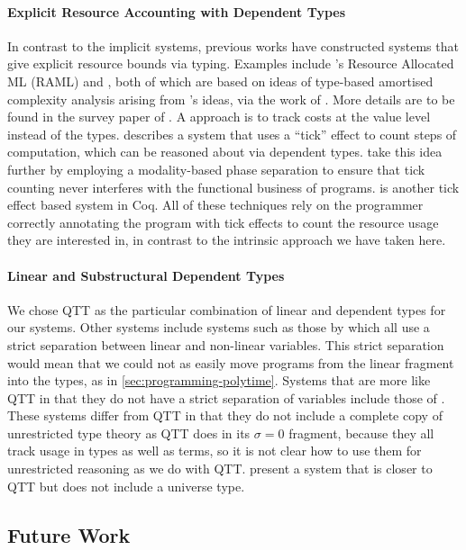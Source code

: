 \documentclass[acmsmall,screen]{acmart}
\begin{document}
\paragraph{Explicit Resource Accounting with Dependent Types} In
contrast to the implicit systems, previous works have constructed
systems that give explicit resource bounds via typing. Examples
include \citet{HoffmannDW17}'s Resource Allocated ML (RAML) and
\citet{RajaniG0021}, both of which are based on ideas of type-based
amortised complexity analysis arising from \cite{hofmann99lfpl}'s
ideas, via the work of \cite{HofmannJ03}. More details are to be found
in the survey paper of \citet{HoffmannJ22}. A approach is to track
costs at the value level instead of the types. \citet{Danielsson08}
describes a system that uses a ``tick'' effect to count steps of
computation, which can be reasoned about via dependent
types. \citet{NiuSGH22} take this idea further by employing a
modality-based phase separation to ensure that tick counting never
interferes with the functional business of
programs. \citet{McCarthyFNFF16} is another tick effect based system
in Coq. All of these techniques rely on the programmer correctly
annotating the program with tick effects to count the resource usage
they are interested in, in contrast to the intrinsic approach we have
taken here.

\paragraph{Linear and Substructural Dependent Types} We chose QTT as
the particular combination of linear and dependent types for our
systems. Other systems include systems such as those by
\cite{CervesatoP02,KrishnaswamiPB15,Vakar14} which all use a strict
separation between linear and non-linear variables. This strict
separation would mean that we could not as easily move programs from
the linear fragment into the types, as in
\autoref{sec:programming-polytime}. Systems that are more like QTT in
that they do not have a strict separation of variables include those
of \cite{MoonEO21,ChoudhuryEEW21,Abel18}. These systems differ from
QTT in that they do not include a complete copy of unrestricted type
theory as QTT does in its $\sigma = 0$ fragment, because they all
track usage in types as well as terms, so it is not clear how to use
them for unrestricted reasoning as we do with QTT. \citet{FuKS22}
present a system that is closer to QTT but does not include a universe
type.

\subsection{Future Work}
\label{sec:towards-synthetic-complexity-theory}
\end{document}
